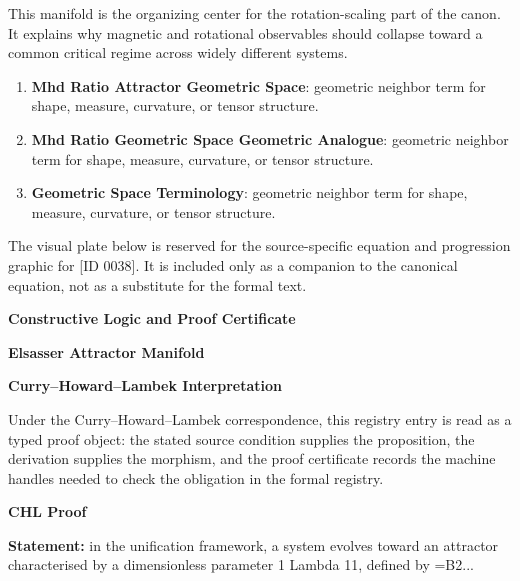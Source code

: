 This manifold is the organizing center for the rotation-scaling part of the canon. It explains why magnetic and rotational observables should collapse toward a common critical regime across widely different systems.
\endgroup

\begingroup\footnotesize\sloppy
\begin{enumerate}[leftmargin=1.35em,itemsep=1pt,topsep=1pt,parsep=0pt]
\item \textbf{Mhd Ratio Attractor Geometric Space}: geometric neighbor term for shape, measure, curvature, or tensor structure.
\item \textbf{Mhd Ratio Geometric Space Geometric Analogue}: geometric neighbor term for shape, measure, curvature, or tensor structure.
\item \textbf{Geometric Space Terminology}: geometric neighbor term for shape, measure, curvature, or tensor structure.
\end{enumerate}
\endgroup

\begingroup\footnotesize\sloppy
The visual plate below is reserved for the source-specific equation and progression graphic for [ID 0038]. It is included only as a companion to the canonical equation, not as a substitute for the formal text.
\par\endgroup
\ifTZPDarkEdition
{}
\fi

\clearpage
\begingroup\tzpsupportsetup
\noindent\textbf{\fontsize{10.8pt}{12.8pt}\selectfont [ID 0038] Constructive Logic and Proof Certificate}\par
\noindent\textbf{\fontsize{10pt}{12pt}\selectfont Elsasser Attractor Manifold}\par
\vspace{0.45em}
\begingroup
\footnotesize
\setlength{\parskip}{0.22em}
\setlength{\parindent}{0pt}
\noindent\textbf{Curry--Howard--Lambek Interpretation}\par
Under the Curry--Howard--Lambek correspondence, this registry entry is read as a typed proof
object: the stated source condition supplies the proposition, the derivation supplies the
morphism, and the proof certificate records the machine handles needed to check the obligation
in the formal registry.

\vspace{0.45em}
\noindent\textbf{CHL Proof}\par
\textbf{Statement:} in the unification framework, a system evolves toward an attractor characterised by a
dimensionless parameter 1 Lambda 11, defined by =B2...

